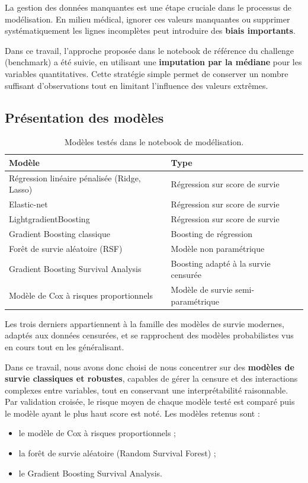 \documentclass[12pt,a4paper]{article}
\begin{document}
La gestion des données manquantes est une étape cruciale dans le processus de modélisation. En milieu médical, ignorer ces valeurs manquantes ou supprimer systématiquement les lignes incomplètes peut introduire des \textbf{biais importants}.

Dans ce travail, l’approche proposée dans le notebook de référence du challenge (benchmark) a été suivie, en utilisant une \textbf{imputation par la médiane} pour les variables quantitatives. Cette stratégie simple permet de conserver un nombre suffisant d’observations tout en limitant l’influence des valeurs extrêmes.

\subsection{Présentation des modèles}
\begin{table}[h]
\centering
\begin{tabular}{@{}ll@{}}
\toprule
\textbf{Modèle} & \textbf{Type} \\
\midrule
Régression linéaire pénalisée (Ridge, Lasso) & Régression sur score de survie \\
Elastic-net & Régression sur score de survie \\
LightgradientBoosting & Régression sur score de survie \\
Gradient Boosting classique               & Boosting de régression \\
Forêt de survie aléatoire (RSF)              & Modèle  non paramétrique \\
Gradient Boosting Survival Analysis          & Boosting adapté à la survie censurée \\Modèle de Cox à risques proportionnels  
         & Modèle de survie semi-paramétrique  \\
\bottomrule
\end{tabular}
\caption{Modèles testés dans le notebook de modélisation.}
\end{table}
Les trois derniers appartiennent à la famille des modèles de survie modernes, adaptés aux données censurées, et se rapprochent des modèles probabilistes vus en cours tout en les généralisant. 

Dans ce travail, nous avons donc choisi de nous concentrer sur des \textbf{modèles de survie classiques et robustes}, capables de gérer la censure et des interactions complexes entre variables, tout en conservant une interprétabilité raisonnable.
Par validation croisée, le risque moyen de chaque modèle testé est comparé puis le modèle ayant le plus haut score est noté.
Les modèles retenus sont :
\begin{itemize}[label=\large$\bullet$]
    \item le modèle de Cox à risques proportionnels ;
    \item la forêt de survie aléatoire (Random Survival Forest) ;
    \item le Gradient Boosting Survival Analysis.
\end{itemize}
\end{document}
